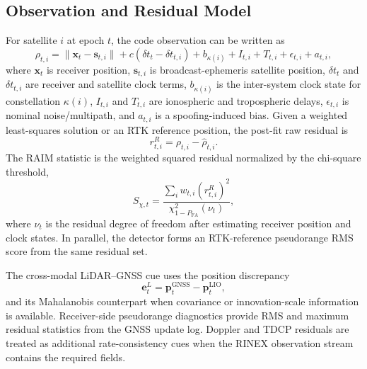 \documentclass[journal]{IEEEtran}
\begin{document}
\subsection{Observation and Residual Model}
For satellite $i$ at epoch $t$, the code observation can be written as
\begin{equation}
\rho_{t,i}= \lVert \mathbf{x}_t-\mathbf{s}_{t,i}\rVert
 + c(\delta t_t-\delta t_{t,i}) + b_{\kappa(i)} + I_{t,i}+T_{t,i}
 + \epsilon_{t,i}+a_{t,i},
\end{equation}
where $\mathbf{x}_t$ is receiver position, $\mathbf{s}_{t,i}$ is broadcast-ephemeris satellite position, $\delta t_t$ and $\delta t_{t,i}$ are receiver and satellite clock terms, $b_{\kappa(i)}$ is the inter-system clock state for constellation $\kappa(i)$, $I_{t,i}$ and $T_{t,i}$ are ionospheric and tropospheric delays, $\epsilon_{t,i}$ is nominal noise/multipath, and $a_{t,i}$ is a spoofing-induced bias.
Given a weighted least-squares solution or an RTK reference position, the post-fit raw residual is
\begin{equation}
r^R_{t,i}=\rho_{t,i}-\hat{\rho}_{t,i}.
\end{equation}
The RAIM statistic is the weighted squared residual normalized by the chi-square threshold,
\begin{equation}
S_{\chi,t}=
\frac{\sum_i w_{t,i}(r^R_{t,i})^2}
{\chi^2_{1-P_{\mathrm{FA}}}(\nu_t)},
\end{equation}
where $\nu_t$ is the residual degree of freedom after estimating receiver position and clock states.
In parallel, the detector forms an RTK-reference pseudorange RMS score from the same residual set.

The cross-modal LiDAR--GNSS cue uses the position discrepancy
\begin{equation}
\mathbf{e}^L_t=\mathbf{p}^{\mathrm{GNSS}}_t-\mathbf{p}^{\mathrm{LIO}}_t,
\end{equation}
and its Mahalanobis counterpart when covariance or innovation-scale information is available.
Receiver-side pseudorange diagnostics provide RMS and maximum residual statistics from the GNSS update log.
Doppler and TDCP residuals are treated as additional rate-consistency cues when the RINEX observation stream contains the required fields.
\end{document}
